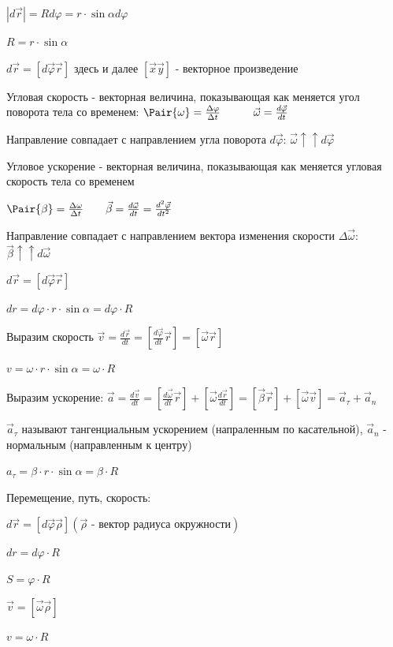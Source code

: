 \documentclass[12pt]{article}
\begin{document}
    $|d\vec{r}| = Rd\varphi = r \cdot \sin \alpha d \varphi$

    $R = r \cdot \sin \alpha$

    $d\vec{r} = [d \vec{\varphi} \vec{r}]$ \hfill {\scriptsize здесь и далее $[\vec{x}\vec{y}]$ - векторное произведение}

    Угловая скорость - векторная величина, показывающая как меняется угол поворота тела со временем: $\Pair{\omega} = \frac{\Delta \varphi}{\Delta t} \quad\quad\quad \vec{\omega} = \frac{d\vec{\varphi}}{dt}$

    Направление совпадает с направлением угла поворота $d\vec{\varphi}$: $\vec{\omega} \uparrow\uparrow d\vec{\varphi}$

    Угловое ускорение - векторная величина, показывающая как меняется угловая скорость тела со временем

    $\Pair{\beta} = \frac{\Delta \omega}{\Delta t} \quad\quad \vec{\beta} = \frac{d\vec{\omega}}{dt} = \frac{d^2 \vec{\varphi}}{dt^2}$

    Направление совпадает с направлением вектора изменения скорости $\Delta \vec{\omega}$: $\vec{\beta} \uparrow\uparrow d\vec{\omega}$

    $d\vec{r} = [d\vec{\varphi} \vec{r}]$

    $dr = d\varphi \cdot r \cdot \sin \alpha = d\varphi \cdot R$

    Выразим скорость $\vec{v} = \frac{d\vec{r}}{dt} = [\frac{d\vec{\varphi}}{dt}\vec{r}] = [\vec{\omega} \vec{r}]$

    $v = \omega \cdot r \cdot \sin \alpha = \omega \cdot R$

    Выразим ускорение: $\vec{a} = \frac{d\vec{v}}{dt} = [\frac{d\vec{\omega}}{dt} \vec{r}] + [\vec{\omega} \frac{d\vec{r}}{dt}] = [\vec{\beta}\vec{r}] + [\vec{\omega}\vec{v}] = \vec{a}_\tau + \vec{a}_n$

    $\vec{a}_\tau$ называют тангенциальным ускорением (напраленным по касательной), $\vec{a}_n$ - нормальным (направленным к центру)

    $a_\tau = \beta \cdot r \cdot \sin\alpha = \beta \cdot R$

    Перемещение, путь, скорость:

    \begin{multicols}{2}

        $d\vec{r} = [d\vec{\varphi} \vec{\rho}] (\vec{\rho}\text{ - вектор радиуса окружности})$

        $dr = d\varphi \cdot R$

        $S = \varphi \cdot R$

        $\vec{v} = [\vec{\omega} \vec{\rho}]$

        $v = \omega \cdot R$

    \end{multicols}
\end{document}
